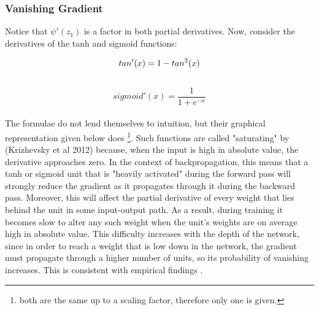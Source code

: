 \documentclass[a4paper,11pt]{article}
\begin{document}
\subsubsection{Vanishing Gradient}

Notice that $\psi'(z_1)$ is a factor in both partial derivatives. Now, consider the derivatives of the tanh and sigmoid functions: 

\begin{equation}
tan'(x) = 1 - tan^2(x)  \\
\end{equation} \\
\begin{equation}
sigmoid'(x) = \frac{1}{1 + e^{-x}}
\end{equation} \\

The formulae do not lend themselves to intuition, but their graphical representation given below does \footnote{both are the same up to a scaling factor, therefore only one is given.}. Such functions are called "saturating" by (Krizhevsky et al 2012) because, when the input is high in absolute value, the derivative approaches zero. In the context of backpropagation, this means that a tanh or sigmoid unit that is "heavily activated" during the forward pass will strongly reduce the gradient as it propagates through it during the backward pass. Moreover, this will affect the partial derivative of every weight that lies behind the unit in some input-output path. As a result, during training it becomes slow to alter any such weight when the unit's weights are on average high in absolute value. This difficulty increases with the depth of the network, since in order to reach a weight that is low down in the network, the gradient must propagate through a higher number of units, so its probability of vanishing increases. This is consistent with empirical findings \cite{DL-book}. \\
\end{document}
